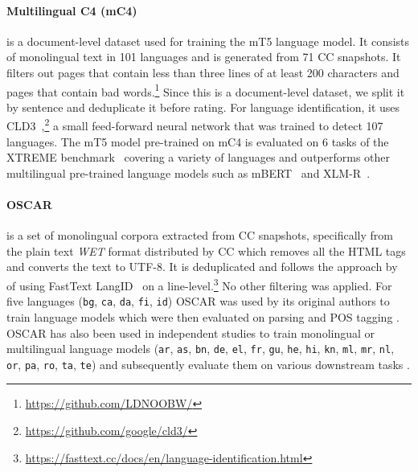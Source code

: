 \paragraph{Multilingual C4 (mC4)~\citep{xue-etal-2021-mt5}} is a document-level dataset used for training the mT5 language model. It consists of monolingual text in 101 languages and is generated from 71 CC snapshots. It filters out pages that contain less than three lines of at least 200 characters and pages that contain bad words.\footnote{\url{https://github.com/LDNOOBW/}} Since this is a document-level dataset, we split it by sentence and deduplicate it before rating. For language identification, it uses CLD3~\citep{botha-etal-2017-natural},\footnote{\url{https://github.com/google/cld3/}} a small feed-forward neural network that was trained to detect 107 languages.
The mT5 model pre-trained on mC4
is evaluated on 6 tasks of the XTREME benchmark~\citep{hu-etal-2020-xtreme} covering a variety of languages and outperforms other multilingual pre-trained language models such as mBERT~\citep{devlin-etal-2019-bert} and XLM\nobreakdash-R~\citep{conneau-etal-2020-unsupervised}.%

\paragraph{OSCAR~\citep{ortiz-suarez-etal-2019-asynchronous, ortiz-suarez-etal-2020-monolingual}}is a set of monolingual corpora extracted from CC snapshots, specifically from the plain text \emph{WET} format distributed by CC which removes all the HTML tags and converts the text to UTF-8. It is deduplicated and follows the approach by~\citep{grave-etal-2018-learning} of using FastText LangID~\citep{joulin-etal-2016-fasttext, joulin-etal-2017-bag} on a line-level.\footnote{\url{https://fasttext.cc/docs/en/language-identification.html} } No other filtering was applied.
% 
For five languages (\texttt{bg}, \texttt{ca}, \texttt{da}, \texttt{fi}, \texttt{id}) OSCAR was used by its original authors to train language models which were then evaluated on parsing and POS tagging \citep{ortiz-suarez-etal-2020-monolingual}. OSCAR has also been used in independent studies to train monolingual or multilingual language models (\texttt{ar}, \texttt{as}, \texttt{bn}, \texttt{de}, \texttt{el}, \texttt{fr}, \texttt{gu}, \texttt{he}, \texttt{hi}, \texttt{kn}, \texttt{ml}, \texttt{mr}, \texttt{nl}, \texttt{or}, \texttt{pa}, \texttt{ro}, \texttt{ta}, \texttt{te}) and subsequently evaluate them on various downstream tasks \citep{antoun-etal-2021-araelectra, kakwani-etal-2020-indicnlpsuite, wilie-etal-2020-indonlu, chan-etal-2020-germans, koutsikakis-etal-2020-greek, martin-etal-2020-camembert, chriqui-etal-2021-hebert, seker-etal-2021-alephbert, delobelle-etal-2020-robbert, dumitrescu-etal-2020-birth, masala-etal-2020-robert}.


